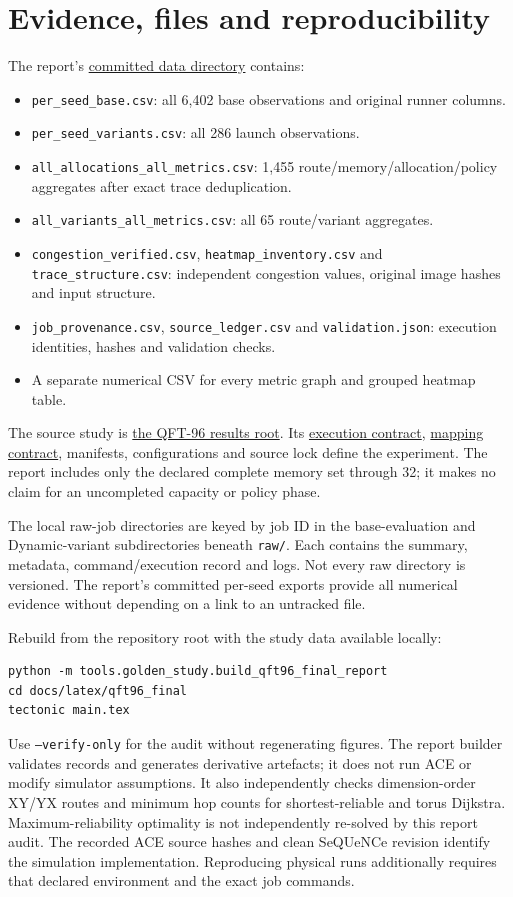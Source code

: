 \documentclass[10pt,a4paper,oneside]{report}
\newcommand{\repo}{https://github.com/sanjeevkrishnaa/Compiler-Driven-ACE}
\newcommand{\dataurl}{\repo/tree/codex/ace-scheduler-correctness/docs/latex/qft96_final/data}
\begin{document}
\chapter{Evidence, files and reproducibility}
The report's \href{\dataurl}{committed data directory} contains:
\begin{itemize}
\item \texttt{per\_seed\_base.csv}: all 6,402 base observations and original runner columns.
\item \texttt{per\_seed\_variants.csv}: all 286 launch observations.
\item \texttt{all\_allocations\_all\_metrics.csv}: 1,455 route/memory/allocation/policy aggregates after exact trace deduplication.
\item \texttt{all\_variants\_all\_metrics.csv}: all 65 route/variant aggregates.
\item \texttt{congestion\_verified.csv}, \texttt{heatmap\_inventory.csv} and \texttt{trace\_structure.csv}: independent congestion values, original image hashes and input structure.
\item \texttt{job\_provenance.csv}, \texttt{source\_ledger.csv} and \texttt{validation.json}: execution identities, hashes and validation checks.
\item A separate numerical CSV for every metric graph and grouped heatmap table.
\end{itemize}
The source study is \href{\repo/tree/codex/ace-scheduler-correctness/results/qft96_2seed_2026-10-26}{the QFT-96 results root}. Its \href{\repo/blob/codex/ace-scheduler-correctness/results/qft96_2seed_2026-10-26/execution_spec.json}{execution contract}, \href{\repo/blob/codex/ace-scheduler-correctness/results/qft96_2seed_2026-10-26/mapping_contract.json}{mapping contract}, manifests, configurations and source lock define the experiment. The report includes only the declared complete memory set through 32; it makes no claim for an uncompleted capacity or policy phase.

The local raw-job directories are keyed by job ID in the base-evaluation and Dynamic-variant subdirectories beneath \texttt{raw/}. Each contains the summary, metadata, command/execution record and logs. Not every raw directory is versioned. The report's committed per-seed exports provide all numerical evidence without depending on a link to an untracked file.

Rebuild from the repository root with the study data available locally:
\begin{verbatim}
python -m tools.golden_study.build_qft96_final_report
cd docs/latex/qft96_final
tectonic main.tex
\end{verbatim}
Use \texttt{--verify-only} for the audit without regenerating figures. The report builder validates records and generates derivative artefacts; it does not run ACE or modify simulator assumptions. It also independently checks dimension-order XY/YX routes and minimum hop counts for shortest-reliable and torus Dijkstra. Maximum-reliability optimality is not independently re-solved by this report audit. The recorded ACE source hashes and clean SeQUeNCe revision identify the simulation implementation. Reproducing physical runs additionally requires that declared environment and the exact job commands.
\end{document}
